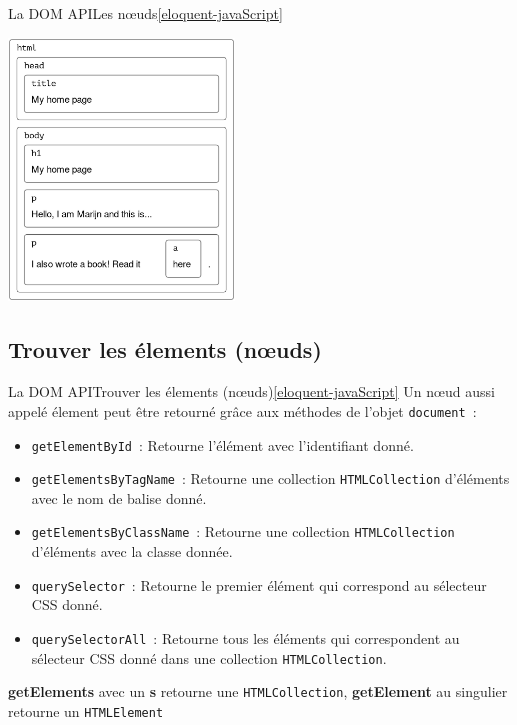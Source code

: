 \documentclass{beamer}
\begin{document}
    \begin{frame}{La DOM API}{Les nœuds\cref{eloquent-javaScript}}
        \begin{center}
            \includegraphics[width=6cm]{image/html-boxes}
        \end{center}
    \end{frame}

    \subsection{Trouver les élements (nœuds)}\label{subsec:elements}
    \begin{frame}{La DOM API}{Trouver les élements (nœuds)\cref{eloquent-javaScript}}
        Un nœud aussi appelé élement peut être retourné grâce aux méthodes de l'objet \lstinline{document}~:
        \begin{itemize}
            \item \lstinline{getElementById}~: Retourne l'élément avec l'identifiant donné.
            \item \lstinline{getElementsByTagName}~: Retourne une collection \lstinline{HTMLCollection} d'éléments avec le nom de balise donné.
            \item \lstinline{getElementsByClassName}~: Retourne une collection \lstinline{HTMLCollection} d'éléments avec la classe donnée.
            \item \lstinline{querySelector}~: Retourne le premier élément qui correspond au sélecteur CSS donné.
            \item \lstinline{querySelectorAll}~: Retourne tous les éléments qui correspondent au sélecteur CSS donné dans une collection \lstinline{HTMLCollection}.
        \end{itemize}
        \begin{dangercolorbox}
            \textbf{getElements} avec un \textbf{s} retourne une \lstinline{HTMLCollection}, \textbf{getElement} au singulier retourne un \lstinline{HTMLElement}
        \end{dangercolorbox}
    \end{frame}
\end{document}
